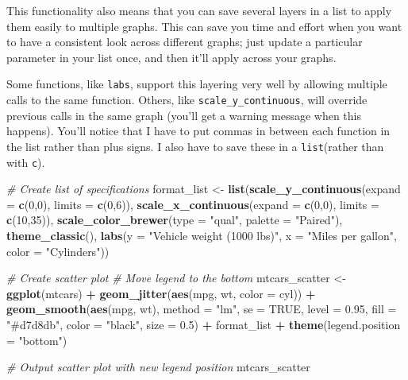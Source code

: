 \documentclass[
]{book}
\newenvironment{Shaded}{\begin{snugshade}}{\end{snugshade}}
\newcommand{\CommentTok}[1]{\textcolor[rgb]{0.56,0.35,0.01}{\textit{#1}}}
\newcommand{\DataTypeTok}[1]{\textcolor[rgb]{0.13,0.29,0.53}{#1}}
\newcommand{\DecValTok}[1]{\textcolor[rgb]{0.00,0.00,0.81}{#1}}
\newcommand{\FloatTok}[1]{\textcolor[rgb]{0.00,0.00,0.81}{#1}}
\newcommand{\KeywordTok}[1]{\textcolor[rgb]{0.13,0.29,0.53}{\textbf{#1}}}
\newcommand{\NormalTok}[1]{#1}
\newcommand{\OperatorTok}[1]{\textcolor[rgb]{0.81,0.36,0.00}{\textbf{#1}}}
\newcommand{\OtherTok}[1]{\textcolor[rgb]{0.56,0.35,0.01}{#1}}
\newcommand{\StringTok}[1]{\textcolor[rgb]{0.31,0.60,0.02}{#1}}
\begin{document}
This functionality also means that you can save several layers in a list to apply them easily to multiple graphs. This can save you time and effort when you want to have a consistent look across different graphs; just update a particular parameter in your list once, and then it'll apply across your graphs.

Some functions, like \texttt{labs}, support this layering very well by allowing multiple calls to the same function. Others, like \texttt{scale\_y\_continuous}, will override previous calls in the same graph (you'll get a warning message when this happens). You'll notice that I have to put commas in between each function in the list rather than plus signs. I also have to save these in a \texttt{list}(rather than with \texttt{c}).

\begin{Shaded}
\begin{Highlighting}[]
\CommentTok{# Create list of specifications}
\NormalTok{format_list <-}\StringTok{ }\KeywordTok{list}\NormalTok{(}\KeywordTok{scale_y_continuous}\NormalTok{(}\DataTypeTok{expand =} \KeywordTok{c}\NormalTok{(}\DecValTok{0}\NormalTok{,}\DecValTok{0}\NormalTok{), }\DataTypeTok{limits =} \KeywordTok{c}\NormalTok{(}\DecValTok{0}\NormalTok{,}\DecValTok{6}\NormalTok{)),}
                    \KeywordTok{scale_x_continuous}\NormalTok{(}\DataTypeTok{expand =} \KeywordTok{c}\NormalTok{(}\DecValTok{0}\NormalTok{,}\DecValTok{0}\NormalTok{), }\DataTypeTok{limits =} \KeywordTok{c}\NormalTok{(}\DecValTok{10}\NormalTok{,}\DecValTok{35}\NormalTok{)),}
                    \KeywordTok{scale_color_brewer}\NormalTok{(}\DataTypeTok{type =} \StringTok{"qual"}\NormalTok{, }\DataTypeTok{palette =} \StringTok{"Paired"}\NormalTok{),}
                    \KeywordTok{theme_classic}\NormalTok{(),}
                    \KeywordTok{labs}\NormalTok{(}\DataTypeTok{y =} \StringTok{"Vehicle weight (1000 lbs)"}\NormalTok{,}
                         \DataTypeTok{x =} \StringTok{"Miles per gallon"}\NormalTok{,}
                         \DataTypeTok{color =} \StringTok{"Cylinders"}\NormalTok{))}

\CommentTok{# Create scatter plot}
  \CommentTok{# Move legend to the bottom}
\NormalTok{mtcars_scatter <-}\StringTok{ }\KeywordTok{ggplot}\NormalTok{(mtcars) }\OperatorTok{+}
\StringTok{  }\KeywordTok{geom_jitter}\NormalTok{(}\KeywordTok{aes}\NormalTok{(mpg, wt, }\DataTypeTok{color =}\NormalTok{ cyl)) }\OperatorTok{+}
\StringTok{  }\KeywordTok{geom_smooth}\NormalTok{(}\KeywordTok{aes}\NormalTok{(mpg, wt), }\DataTypeTok{method =} \StringTok{"lm"}\NormalTok{, }\DataTypeTok{se =} \OtherTok{TRUE}\NormalTok{, }\DataTypeTok{level =} \FloatTok{0.95}\NormalTok{, }
              \DataTypeTok{fill =} \StringTok{"#d7d8db"}\NormalTok{, }\DataTypeTok{color =} \StringTok{"black"}\NormalTok{, }\DataTypeTok{size =} \FloatTok{0.5}\NormalTok{) }\OperatorTok{+}
\StringTok{  }\NormalTok{format_list }\OperatorTok{+}
\StringTok{  }\KeywordTok{theme}\NormalTok{(}\DataTypeTok{legend.position =} \StringTok{"bottom"}\NormalTok{)}

\CommentTok{# Output scatter plot with new legend position}
\NormalTok{mtcars_scatter}
\end{Highlighting}
\end{Shaded}
\end{document}
